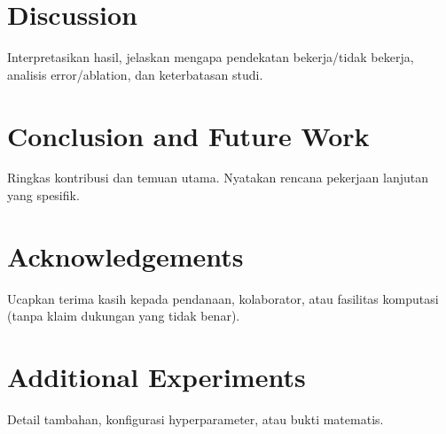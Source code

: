 \documentclass[10pt,a4paper]{article}
\begin{document}
	
	\section{Discussion}
	Interpretasikan hasil, jelaskan mengapa pendekatan bekerja/tidak bekerja, analisis error/ablation, dan keterbatasan studi.
	
	\section{Conclusion and Future Work}
	Ringkas kontribusi dan temuan utama. Nyatakan rencana pekerjaan lanjutan yang spesifik.
	
	\section*{Acknowledgements}
	Ucapkan terima kasih kepada pendanaan, kolaborator, atau fasilitas komputasi (tanpa klaim dukungan yang tidak benar).
	
	\printbibliography
	
	\appendix
	\section{Additional Experiments}
	Detail tambahan, konfigurasi hyperparameter, atau bukti matematis.
	
\end{document}
